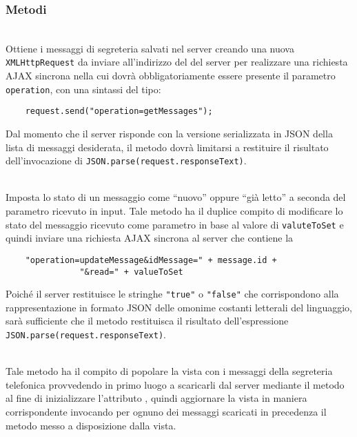 \subsubsection*{Metodi}
\begin{description}

  \item{}\\
  Ottiene i messaggi di segreteria salvati nel server creando una nuova \verb'XMLHttpRequest' da inviare all'indirizzo del  del server per realizzare una richiesta AJAX sincrona nella cui  dovrà obbligatoriamente essere presente il parametro \verb'operation', con una sintassi del tipo:
  \begin{verbatim}
    request.send("operation=getMessages");
  \end{verbatim}
  
  Dal momento che il server risponde con la versione serializzata in JSON della lista di messaggi desiderata, il metodo dovrà limitarsi a restituire il risultato dell'invocazione di \verb'JSON.parse(request.responseText)'.
  
    \item{}\\
  Imposta lo stato di un messaggio come ``nuovo'' oppure ``già letto'' a seconda del parametro ricevuto in input. Tale metodo ha il duplice compito di modificare lo stato del messaggio ricevuto come parametro in base al valore di \verb'valuteToSet' e quindi inviare una richiesta AJAX sincrona al server che contiene la 
  \begin{verbatim}
    "operation=updateMessage&idMessage=" + message.id +
               "&read=" + valueToSet
  \end{verbatim}
  
  Poiché il server restituisce le stringhe \verb'"true"' o \verb'"false"' che corrispondono alla rappresentazione in formato JSON delle omonime costanti letterali del linguaggio, sarà sufficiente che il metodo restituisca il risultato dell'espressione \verb'JSON.parse(request.responseText)'.
  
  \item{}\\
  Tale metodo ha il compito di popolare la vista con i messaggi della segreteria telefonica provvedendo in primo luogo a scaricarli dal server mediante il metodo  al fine di inizializzare l'attributo , quindi aggiornare la vista in maniera corrispondente invocando per ognuno dei messaggi scaricati in precedenza il metodo  messo a disposizione dalla vista.
  

\end{description}
